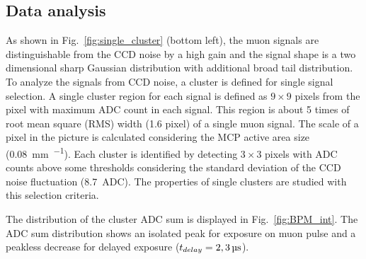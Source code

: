 \documentclass[preprint,3p,twocolumn]{elsarticle}
\begin{document}
\subsection{Data analysis}


As shown in Fig.~\ref{fig:single_cluster} (bottom left), the muon signals are distinguishable from the CCD noise by a high gain and the signal shape is a two dimensional sharp Gaussian distribution with additional broad tail distribution. 
To analyze the signals from CCD noise, a cluster is defined for single signal selection. A single cluster region for each signal is defined as $9 \times 9$ pixels from the pixel with maximum ADC count in each signal. This region is about 5 times of root mean square (RMS) width (1.6 pixel) of a single muon signal. The scale of a pixel in the picture is calculated considering the MCP active area size (\SI{0.08}{\mm \per \pixel}).
Each cluster is identified by detecting $3 \times 3$ pixels with ADC counts above some thresholds considering the standard deviation of the CCD noise fluctuation (\SI{8.7}{ADC}). The properties of single clusters are studied with this selection criteria.

The distribution of the cluster ADC sum is displayed in Fig.~\ref{fig:BPM_int}.
The ADC sum distribution shows an isolated peak for exposure on muon pulse and a peakless decrease for delayed exposure
($t_{delay} = \SIlist[list-pair-separator = {, }, list-units = single]{2; 3}{\micro\s}$).
\end{document}
